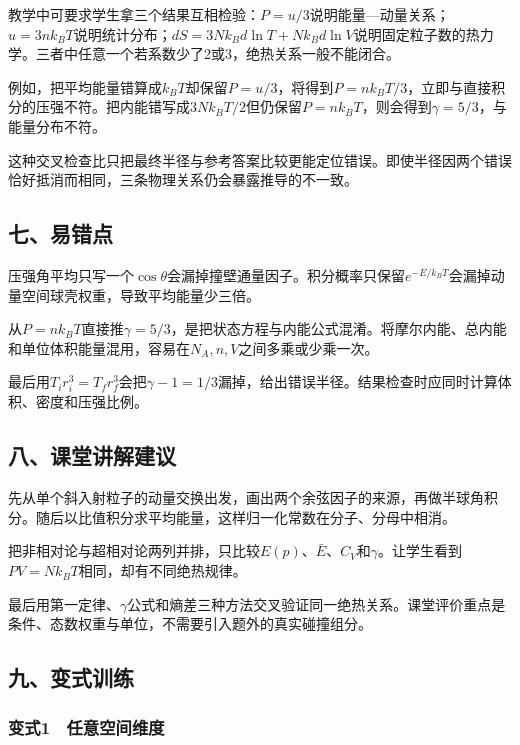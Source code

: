 \documentclass[12pt,a4paper,fontset=fandol]{ctexart}
\begin{document}
教学中可要求学生拿三个结果互相检验：\(P=u/3\)说明能量---动量关系；\(u=3nk_BT\)说明统计分布；\(dS=3Nk_Bd\ln T+Nk_Bd\ln V\)说明固定粒子数的热力学。三者中任意一个若系数少了2或3，绝热关系一般不能闭合。

例如，把平均能量错算成\(k_BT\)却保留\(P=u/3\)，将得到\(P=nk_BT/3\)，立即与直接积分的压强不符。把内能错写成\(3Nk_BT/2\)但仍保留\(P=nk_BT\)，则会得到\(\gamma=5/3\)，与能量分布不符。

这种交叉检查比只把最终半径与参考答案比较更能定位错误。即使半径因两个错误恰好抵消而相同，三条物理关系仍会暴露推导的不一致。

\subsection{七、易错点}\label{ux4e03ux6613ux9519ux70b9-6}

压强角平均只写一个\(\cos\theta\)会漏掉撞壁通量因子。积分概率只保留\(e^{-E/k_BT}\)会漏掉动量空间球壳权重，导致平均能量少三倍。

从\(P=nk_BT\)直接推\(\gamma=5/3\)，是把状态方程与内能公式混淆。将摩尔内能、总内能和单位体积能量混用，容易在\(N_A,n,V\)之间多乘或少乘一次。

最后用\(T_ir_i^3=T_fr_f^3\)会把\(\gamma-1=1/3\)漏掉，给出错误半径。结果检查时应同时计算体积、密度和压强比例。

\subsection{八、课堂讲解建议}\label{ux516bux8bfeux5802ux8bb2ux89e3ux5efaux8bae-6}

先从单个斜入射粒子的动量交换出发，画出两个余弦因子的来源，再做半球角积分。随后以比值积分求平均能量，这样归一化常数在分子、分母中相消。

把非相对论与超相对论两列并排，只比较\(E(p)\)、\(\bar E\)、\(C_V\)和\(\gamma\)。让学生看到\(PV=Nk_BT\)相同，却有不同绝热规律。

最后用第一定律、\(\gamma\)公式和熵差三种方法交叉验证同一绝热关系。课堂评价重点是条件、态数权重与单位，不需要引入题外的真实碰撞组分。

\subsection{九、变式训练}\label{ux4e5dux53d8ux5f0fux8badux7ec3-6}

\subsubsection{变式1　任意空间维度}\label{ux53d8ux5f0f1-ux4efbux610fux7a7aux95f4ux7ef4ux5ea6}
\end{document}
